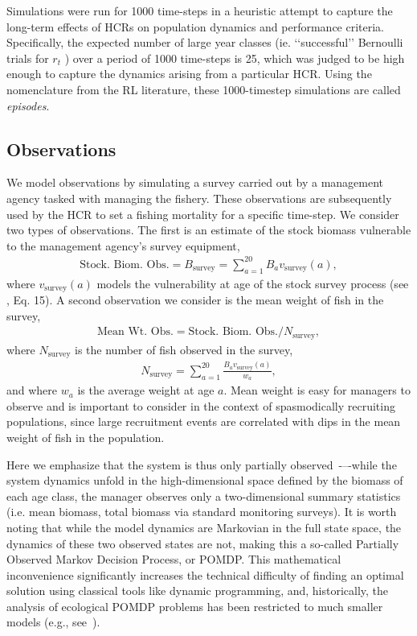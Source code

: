 \documentclass[floatfix,nofootinbib,longbibliography,notitlepage]{revtex4-2}
\def\bsurv{B_{\text{survey}}}
\def\vsurv{v_{\text{survey}}}
\def\nsurv{N_{\text{survey}}}
\begin{document}
Simulations were run for 1000 time-steps in a heuristic attempt to capture the long-term effects of HCRs on population dynamics and performance criteria. 
Specifically, the expected number of large year classes (ie. ‘‘successful’’ Bernoulli trials for $r_t$ ) over a period of 1000 time-steps is 25, which was judged to be high enough to capture the dynamics arising from a particular HCR. 
Using the nomenclature from the RL literature, these 1000-timestep simulations are called \emph{episodes}.

\subsection{Observations}
\label{sec:obs}

We model observations by simulating a survey carried out by a management agency tasked with managing the fishery. 
These observations are subsequently used by the HCR to set a fishing mortality for a specific  time-step. 
We consider two types of observations. 
The first is an estimate of the stock biomass vulnerable to the management agency’s survey equipment,
\begin{align}
    \text{Stock. Biom. Obs.} = \bsurv = \sum_{a=1}^{20} B_a \vsurv(a),
\end{align}
where $\vsurv(a)$ models the vulnerability at age of the stock survey process (see \cite{cahill2022}, Eq. 15). 
A second observation we consider is the mean weight of fish in the survey,
\begin{align}
    \text{Mean Wt. Obs.} = \text{Stock. Biom. Obs.} / \nsurv,
\end{align}
where $\nsurv$ is the number of fish observed in the survey,
\begin{align}
    \nsurv = \sum_{a=1}^{20} \frac{B_a \vsurv(a)}{w_a},
\end{align}
and where $w_a$ is the average weight at age $a$.
Mean weight is easy for managers to observe and is important to consider in the context of spasmodically recruiting populations, since large recruitment events are correlated with dips in the mean weight of fish in the population.

Here we emphasize that the system is thus only partially observed~\cite{memarzadeh2019}-–-while the system dynamics unfold in the high-dimensional space defined by the biomass of each age class, the manager observes only a two-dimensional summary statistics (i.e. mean biomass, total biomass via standard monitoring surveys). 
It is worth noting that while the model dynamics are Markovian in the full state space, the dynamics of these two observed states are not, making this a so-called Partially Observed Markov Decision Process, or POMDP.  
This mathematical inconvenience significantly increases the technical difficulty  of finding an optimal solution using classical tools like dynamic programming, and, historically, the analysis of ecological POMDP problems has been restricted to much smaller models  (e.g., see~\cite{williams2022}).
\end{document}
